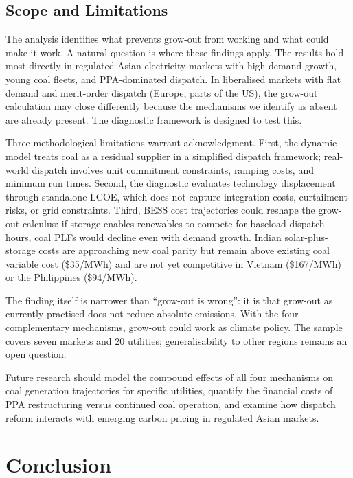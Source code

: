 \documentclass[review,3p,authoryear]{elsarticle}
\begin{document}
\subsection{Scope and Limitations}

The analysis identifies what prevents grow-out from working and what could make it work. A natural question is where these findings apply. The results hold most directly in regulated Asian electricity markets with high demand growth, young coal fleets, and PPA-dominated dispatch. In liberalised markets with flat demand and merit-order dispatch (Europe, parts of the US), the grow-out calculation may close differently because the mechanisms we identify as absent are already present. The diagnostic framework is designed to test this.

Three methodological limitations warrant acknowledgment. First, the dynamic model treats coal as a residual supplier in a simplified dispatch framework; real-world dispatch involves unit commitment constraints, ramping costs, and minimum run times. Second, the diagnostic evaluates technology displacement through standalone LCOE, which does not capture integration costs, curtailment risks, or grid constraints. Third, BESS cost trajectories could reshape the grow-out calculus: if storage enables renewables to compete for baseload dispatch hours, coal PLFs would decline even with demand growth. Indian solar-plus-storage costs are approaching new coal parity but remain above existing coal variable cost (\$35/MWh) and are not yet competitive in Vietnam (\$167/MWh) or the Philippines (\$94/MWh).

The finding itself is narrower than ``grow-out is wrong'': it is that grow-out as currently practised does not reduce absolute emissions. With the four complementary mechanisms, grow-out could work as climate policy. The sample covers seven markets and 20 utilities; generalisability to other regions remains an open question.

Future research should model the compound effects of all four mechanisms on coal generation trajectories for specific utilities, quantify the financial costs of PPA restructuring versus continued coal operation, and examine how dispatch reform interacts with emerging carbon pricing in regulated Asian markets.

\section{Conclusion}
\label{sec:conclusion}
\end{document}
